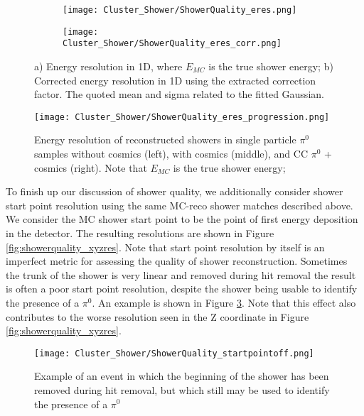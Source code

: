 \begin{figure}[t!]
\centering
  \begin{subfigure}[t]{0.4\textwidth}
    \centering
\texttt{[image: Cluster\_Shower/ShowerQuality\_eres.png]}
  \caption{ }
  \end{subfigure} 
  \hspace{10mm}
  \begin{subfigure}[t]{0.4\textwidth}
    \centering
\texttt{[image: Cluster\_Shower/ShowerQuality\_eres\_corr.png]}
  \caption{ }
  \end{subfigure} 
\caption{a) Energy resolution in 1D, where $E_{MC}$ is the true shower energy; b) Corrected energy resolution in 1D using the extracted correction factor. The quoted mean and sigma related to the fitted Gaussian.}
\label{fig:showerquality_eres_corr}
\end{figure}

\begin{figure}[t!]
\centering
 \texttt{[image: Cluster\_Shower/ShowerQuality\_eres\_progression.png]}
 \caption{Energy resolution of reconstructed showers in single particle $\pi^0$ samples without cosmics (left), with cosmics (middle), and CC $\pi^0$ + cosmics (right). Note that $E_{MC}$ is the true shower energy; }
\label{fig:showerquality_eres_series}
\end{figure}


To finish up our discussion of shower quality, we additionally consider shower start point resolution using the same MC-reco shower matches described above. We consider the MC shower start point to be the point of first energy deposition in the detector. The resulting resolutions are shown in Figure \ref{fig:showerquality_xyzres}. Note that start point resolution by itself is an imperfect metric for assessing the quality of shower reconstruction. Sometimes the trunk of the shower is very linear and removed during hit removal the result is often a poor start point resolution, despite the shower being usable to identify the presence of a $\pi^0$. An example is shown in Figure \ref{fig:showerquality_startpointoff}.  Note that this effect also contributes to the worse resolution seen in the Z coordinate in Figure \ref{fig:showerquality_xyzres}.

\begin{figure}[h!]
\centering
\texttt{[image: Cluster\_Shower/ShowerQuality\_startpointoff.png]}
\caption{Example of an event in which the beginning of the shower has been removed during hit removal, but which still may be used to identify the presence of a $\pi^0$ }
\label{fig:showerquality_startpointoff}
\end{figure}

